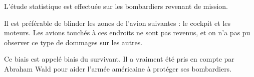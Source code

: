 \documentclass[12pt,a4paper]{book}
\begin{document}
\begin{enumMet}
	\item L'étude statistique est effectuée sur les bombardiers revenant de mission.
	\item Il est préférable de blinder les zones de l'avion suivantes : le cockpit et les moteurs. Les avions touchés à ces endroits ne sont pas revenus, et on n'a pas pu observer ce type de dommages sur les autres.
	
	
	
	Ce biais est appelé biais du survivant. Il a vraiment été pris en compte par Abraham Wald pour aider l'armée américaine à protéger ses bombardiers.	
\end{enumMet}
\end{document}
